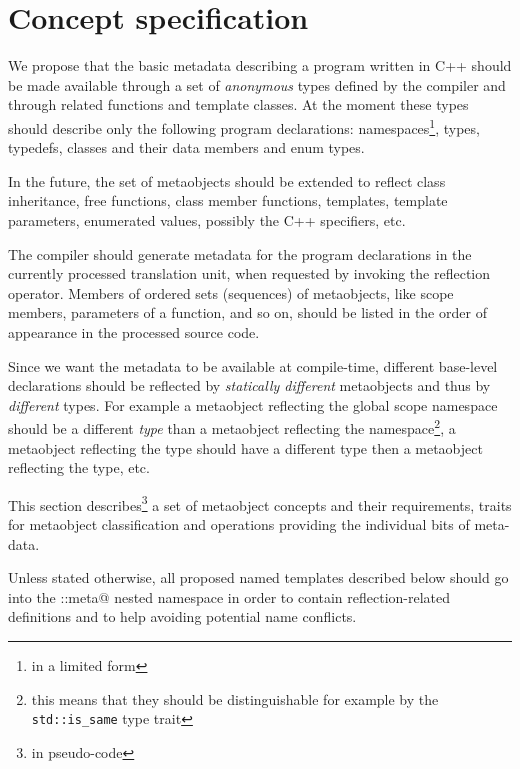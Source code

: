\section{Concept specification}
\label{section-current-Concepts}

We propose that the basic metadata describing a program written
in C++ should be made available through a set of {\em anonymous} types
defined by the compiler and through related functions and template classes.
At the moment these types should describe only the following program
declarations: namespaces\footnote{in a limited form}, types, typedefs,
classes and their data members and enum types.

In the future, the set of metaobjects should be extended to reflect
class inheritance, free functions, class member functions, templates,
template parameters, enumerated values, possibly the C++ specifiers, etc.

The compiler should generate metadata for the program declarations
in the currently processed translation unit, when requested by invoking
the reflection operator. Members of ordered sets (sequences) of metaobjects,
like scope members, parameters of a function, and so on, should be listed
in the order of appearance in the processed source code.

Since we want the metadata to be available at compile-time,
different base-level declarations should be reflected by
{\em statically different} metaobjects and thus by {\em different} types.
For example a metaobject reflecting the global scope namespace should
be a different {\em type} than a metaobject reflecting the \verb@std@
namespace\footnote{this means that they should be distinguishable for
example by the \texttt{std::is\_same} type trait},
a metaobject reflecting the \verb@int@ type should
have a different type then a metaobject reflecting the \verb@double@
type, etc.

This section describes\footnote{in pseudo-code} a set of metaobject concepts
and their requirements, traits for metaobject classification and operations
providing the individual bits of meta-data.

Unless stated otherwise, all proposed named templates described below should
go into the \verb@std::meta@ nested namespace in order to contain reflection-related
definitions and to help avoiding potential name conflicts.

























